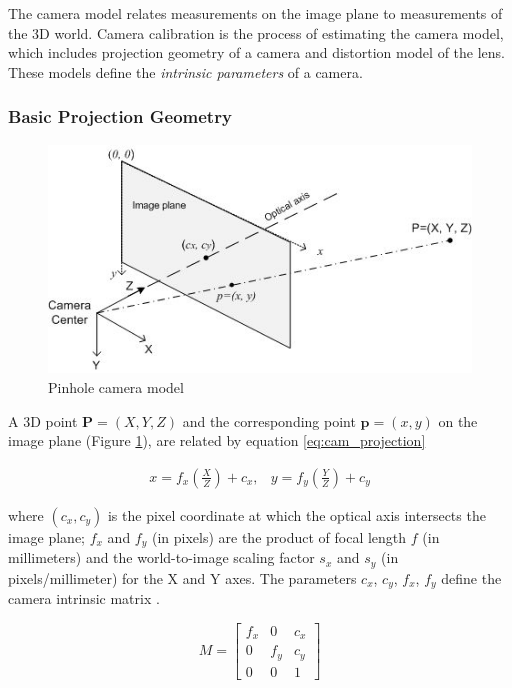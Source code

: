 The camera model relates measurements on the image plane to measurements of
the 3D world. Camera calibration is the process of estimating the camera
model, which includes projection geometry of a camera and distortion
model of the lens. These models define the \textit{intrinsic
  parameters} of a camera.

\subsubsection{Basic Projection Geometry}
\begin{figure}[h]
\centering
\includegraphics[width=12cm, keepaspectratio=true]{./Figures/camera_model.jpg}
\caption{Pinhole camera model}
\label{figch2:cammodel}
\end{figure}

A 3D point $\boldsymbol{P}=(X, Y, Z)$ and the corresponding point
$\boldsymbol{p}=(x, y)$ on the image plane (Figure
\ref{figch2:cammodel}), are related by equation \ref{eq:cam_projection}
\cite{bradski_learning_2008}

\begin{equation}
\label{eq:cam_projection}
\begin{matrix}
x = f_x\left(\frac{X}{Z}\right)+c_x, &
y=f_y\left(\frac{Y}{Z}\right)+c_y
\end{matrix}
\end{equation}

\noindent where $(c_x, c_y)$ is the pixel coordinate at which the optical
axis intersects the image plane; $f_x$ and $f_y$ (in pixels) are the product
of focal length $f$ (in millimeters) and the world-to-image scaling
factor $s_x$ and $s_y$ (in pixels/millimeter) for the X and Y axes. The
parameters $c_x$, $c_y$, $f_x$, $f_y$ define the camera intrinsic
matrix \cite{bradski_learning_2008} \cite{heikkila_four-step_1997}.

\begin{equation}
M = \begin{bmatrix}
f_x & 0 & c_x \\
0& f_y & c_y \\
0 & 0 & 1 \end{bmatrix}
\end{equation}

